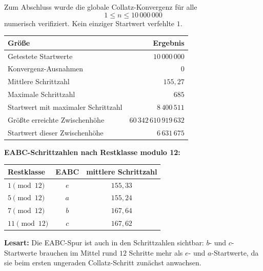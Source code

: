 \documentclass[12pt,a4paper]{article}
\begin{document}
\begin{tcolorbox}[
colback=cyan!3,
colframe=cyan!50!black,
title=\textbf{6. Vollständiger Kollatz-Test: Alle Startwerte $1 \le n \le 10^7$}
]
Zum Abschluss wurde die globale Collatz-Konvergenz für alle
\[
1 \le n \le 10\,000\,000
\]
numerisch verifiziert. Kein einziger Startwert verfehlte \(1\).

\medskip
\begin{center}
\begin{tabular}{lr}
\toprule
Größe & Ergebnis\\
\midrule
Getestete Startwerte & \(10\,000\,000\)\\
Konvergenz-Ausnahmen & \(0\)\\
Mittlere Schrittzahl & \(155{,}27\)\\
Maximale Schrittzahl & \(685\)\\
Startwert mit maximaler Schrittzahl & \(8\,400\,511\)\\
Größte erreichte Zwischenhöhe & \(60\,342\,610\,919\,632\)\\
Startwert dieser Zwischenhöhe & \(6\,631\,675\)\\
\bottomrule
\end{tabular}
\end{center}

\medskip
\textbf{EABC-Schrittzahlen nach Restklasse modulo 12:}

\begin{center}
\begin{tabular}{lcc}
\toprule
Restklasse & EABC & mittlere Schrittzahl\\
\midrule
\(1 \pmod{12}\) & \(e\) & \(155{,}33\)\\
\(5 \pmod{12}\) & \(a\) & \(155{,}24\)\\
\(7 \pmod{12}\) & \(b\) & \(167{,}64\)\\
\(11 \pmod{12}\) & \(c\) & \(167{,}62\)\\
\bottomrule
\end{tabular}
\end{center}

\medskip
\textbf{Lesart:}
Die EABC-Spur ist auch in den Schrittzahlen sichtbar:
\(b\)- und \(c\)-Startwerte brauchen im Mittel rund \(12\) Schritte mehr als \(e\)- und \(a\)-Startwerte,
da sie beim ersten ungeraden Collatz-Schritt zunächst anwachsen.
\end{tcolorbox}
\end{document}
